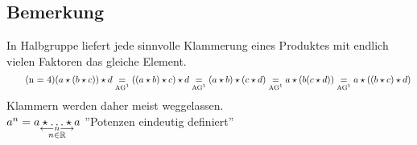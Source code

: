 \subsection{Bemerkung}\label{sec:1.4}
In Halbgruppe liefert jede sinnvolle Klammerung eines Produktes mit endlich vielen Faktoren das gleiche Element.
\begin{equation}
\tag{n = 4}
(a \star (b \star c)) \star d \underset{\text{AG\footnotemark[1]}}{=} ((a \star b)\star c)\star d \underset{\text{AG\footnotemark[1]}}{=} (a \star b) \star (c \star d) \underset{\text{AG\footnotemark[1]}}{=} a \star (b (c \star d)) \underset{\text{AG\footnotemark}}{=} a \star ((b \star c)\star d)
\end{equation}
Klammern werden daher meist weggelassen.\\
$a^n = \underset{\substack{\longleftarrow n \longrightarrow\\
n \in \mathbb{R}}}{a\star\ldots\star a}$ ''Potenzen eindeutig definiert''
